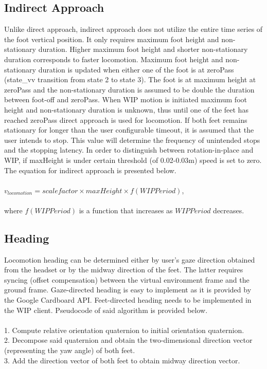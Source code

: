\subsection{Indirect Approach}
Unlike direct approach, indirect approach does not utilize the entire time series of the foot vertical position. It only requires maximum foot height and non-stationary duration. Higher maximum foot height and shorter non-stationary duration corresponds to faster locomotion. Maximum foot height and non-stationary duration is updated when either one of the foot is at zeroPass (state\_vv transition from state 2 to state 3). The foot is at maximum height at zeroPass and the non-stationary duration is assumed to be double the duration between foot-off and zeroPass. When WIP motion is initiated maximum foot height and non-stationary duration is unknown, thus until one of the feet has reached zeroPass direct approach is used for locomotion. If both feet remains stationary for longer than the user configurable timeout, it is assumed that the user intends to stop. This value will determine the frequency of unintended stops and the stopping latency. In order to distinguish between rotation-in-place and WIP, if maxHeight is under certain threshold (of 0.02-0.03m) speed is set to zero. The equation for indirect approach is presented below.
\\\\
\indent
$v_{locomotion} = scale factor\times maxHeight \times f(WIPPeriod)$,
\\\\
where $f(WIPPeriod)$ is a function that increases as $WIPPeriod$ decreases.

\subsection{Heading}
Locomotion heading can be determined either by user's gaze direction obtained from the headset or by the midway direction of the feet. The latter requires syncing (offset compensation) between the virtual environment frame and the ground frame. Gaze-directed heading is easy to implement as it is provided by the Google Cardboard API. Feet-directed heading needs to be implemented in the WIP client. Pseudocode of said algorithm is provided below.
\\\\
1. Compute relative orientation quaternion to initial orientation quaternion.\\
2. Decompose said quaternion and obtain the two-dimensional direction vector (representing the yaw angle) of both feet.\\
3. Add the direction vector of both feet to obtain midway direction vector.